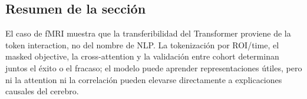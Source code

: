 \subsection{Resumen de la sección}

El caso de fMRI muestra que la transferibilidad del Transformer proviene de la token interaction, no del nombre de NLP. La tokenización por ROI/time, el masked objective, la cross-attention y la validación entre cohort determinan juntos el éxito o el fracaso; el modelo puede aprender representaciones útiles, pero ni la attention ni la correlación pueden elevarse directamente a explicaciones causales del cerebro.
